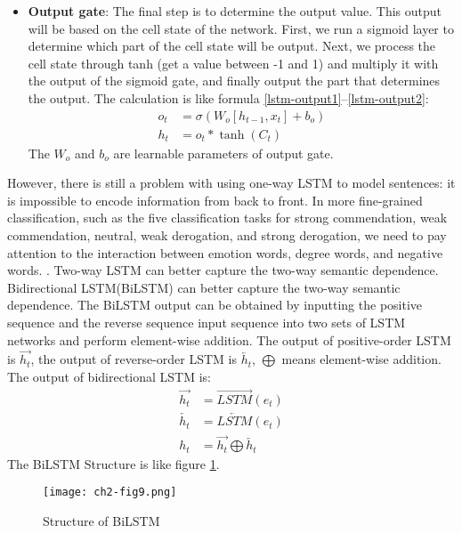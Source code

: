 \begin{itemize}
	\item \textbf{Output gate}: The final step is to determine the output value. This output will be based on the cell state of the network. First, we run a sigmoid layer to determine which part of the cell state will be output. Next, we process the cell state through tanh (get a value between -1 and 1) and multiply it with the output of the sigmoid gate, and finally output the part that determines the output. The calculation is like formula \ref{lstm-output1}--\ref{lstm-output2}: 
	\begin{align}
		o_{t}&=\sigma\left(W_{o}\left[h_{t-1}, x_{t}\right]+b_{o}\right) \label{lstm-output1}\\
		h_{t}&=o_{t} * \tanh \left(C_{t}\right) \label{lstm-output2}
	\end{align}
	The $W_o$ and $b_o$ are learnable parameters of output gate.
\end{itemize}

However, there is still a problem with using one-way LSTM to model sentences: it is impossible to encode information from back to front. In more fine-grained classification, such as the five classification tasks for strong commendation, weak commendation, neutral, weak derogation, and strong derogation, we need to pay attention to the interaction between emotion words, degree words, and negative words. . Two-way LSTM can better capture the two-way semantic dependence. Bidirectional LSTM(BiLSTM) can better capture the two-way semantic dependence. The BiLSTM output can be obtained by inputting the positive sequence and the reverse sequence input sequence into two sets of LSTM networks and perform element-wise addition. The output of positive-order LSTM is $\overrightarrow{h_t}$, the output of reverse-order LSTM is $\overleftarrow{h_t}$, $\bigoplus$ means element-wise addition. The output of bidirectional LSTM is: 
\begin{align}
	\overrightarrow{h_t} &= \overrightarrow{LSTM}(e_t)\\
	\overleftarrow{h_t} &= \overleftarrow{LSTM}(e_t)\\
	h_t &=\overrightarrow{h_t}\bigoplus \overleftarrow{h_t}
\end{align}
The BiLSTM Structure is like figure \ref{ch2-fig9}. 

\begin{figure}[h]
	\centering
	\texttt{[image: ch2-fig9.png]}
	\caption{Structure of BiLSTM}
	\label{ch2-fig9}
\end{figure}

